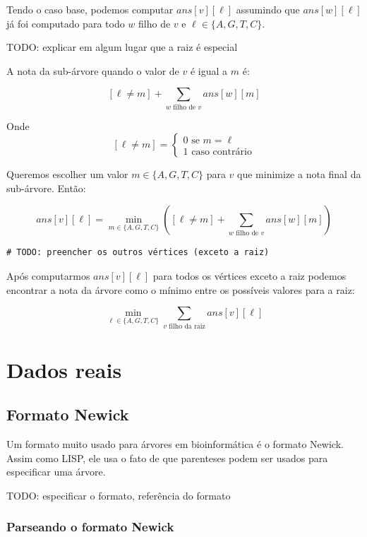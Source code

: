 \documentclass[11pt]{article}
\begin{document}
Tendo o caso base, podemos computar $ans[v][\ell]$ assumindo que $ans[w][\ell]$ já foi computado para
todo $w$ filho de $v$ e $\ell \in \{A, G, T, C\}$.

TODO: explicar em algum lugar que a raiz é especial

A nota da sub-árvore quando o valor de $v$ é igual a $m$ é:

\[[\ell \neq m] + \sum_{w \text{ filho de }v} ans[w][m]\]

Onde \[[\ell \neq m] =  \begin{cases} 0 \text{ se } m = \ell \\
                                     1 \text{ caso contrário}\end{cases}\]

Queremos escolher um valor $m \in \{A, G, T, C\}$ para $v$
que minimize a nota final da sub-árvore. Então:

\[ans[v][\ell] = \min_{m \in \{A, G, T, C\}}  \left([\ell \neq m] + \sum_{w \text{ filho de }v} ans[w][m]\right)\]

\begin{verbatim}
# TODO: preencher os outros vértices (exceto a raiz)
\end{verbatim}

Após computarmos $ans[v][\ell]$ para todos os vértices exceto a raiz
podemos encontrar a nota da árvore como o mínimo entre os possíveis
valores para a raiz:

\[ \min_{\ell \in \{A, G, T, C\}} \sum_{v \text{ filho da raiz}} ans[v][\ell]\]


\section{Dados reais}
\label{sec-3}

\subsection{Formato Newick}
\label{sec-3-1}

Um formato muito usado para árvores em bioinformática é o formato
Newick. Assim como LISP, ele usa o fato de que parenteses podem ser
usados para especificar uma árvore.

TODO: especificar o formato, referência do formato

\subsubsection{Parseando o formato Newick}
\label{sec-3-1-1}
\end{document}
